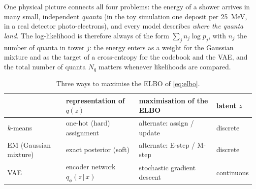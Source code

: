 \documentclass[a4paper,12pt]{article}
\begin{document}
One physical picture connects all four problems: the energy of a shower arrives in many small, independent \emph{quanta} (in the toy simulation one deposit per 25~MeV, in a real detector photo-electrons),
and every model describes \emph{where the quanta land}. The log-likelihood is therefore always of the form $\sum_j n_j\log p_j$, with $n_j$ the number of quanta in tower $j$:
the energy enters as a weight for the Gaussian mixture and as the target of a cross-entropy for the codebook and the VAE, and the total number of quanta $N_q$ matters whenever likelihoods are compared.

\begin{table}[h]
\centering
\small
\setlength{\tabcolsep}{5pt}
\begin{tabular}{@{}llll@{}}
\toprule
 & representation of $q(z)$ & maximisation of the ELBO & latent $z$ \\
\midrule
$k$-means & one-hot (hard) assignment & alternate: assign / update & discrete \\
EM (Gaussian mixture) & exact posterior (soft) & alternate: E-step / M-step & discrete \\
VAE & encoder network $q_\phi(z\,|\,x)$ & stochastic gradient descent & continuous \\
\bottomrule
\end{tabular}
\caption{Three ways to maximise the ELBO of \cref{eq:elbo}.}
\label{tab:methods}
\end{table}
\end{document}
